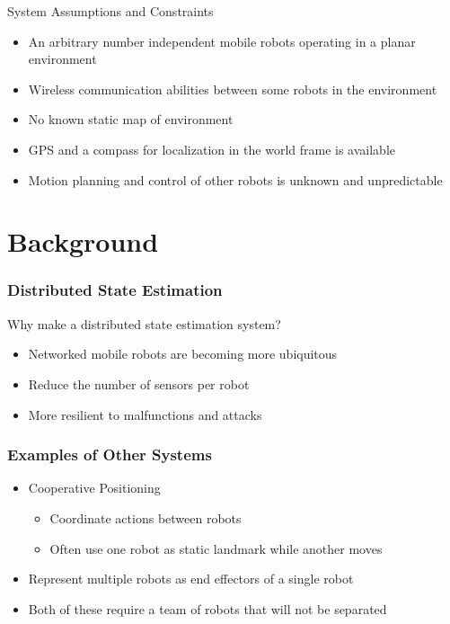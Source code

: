 \documentclass[14pt]{beamer}
\begin{document}
\begin{frame}{System Assumptions and Constraints}
\begin{itemize}
\item An arbitrary number independent mobile robots operating in a planar environment
\pause
\item Wireless communication abilities between some robots in the environment
\pause
\item No known static map of environment
\pause
\item GPS and a compass for localization in the world frame is available
\pause
\item Motion planning and control of other robots is unknown and unpredictable
\end{itemize}
\end{frame}

\section{Background}
\begin{frame}
\frametitle{Distributed State Estimation}
Why make a distributed state estimation system?
\pause
\begin{itemize}
\item Networked mobile robots are becoming more ubiquitous
\pause
\item Reduce the number of sensors per robot
\pause
\item More resilient to malfunctions and attacks
\end{itemize}
\end{frame}

\begin{frame}
\frametitle{Examples of Other Systems}
\begin{itemize}
\item Cooperative Positioning
    \begin{itemize}
    \pause
    \item Coordinate actions between robots
    \item Often use one robot as static landmark while another moves
    \end{itemize}
    \vspace{14pt}
    \pause
\item Represent multiple robots as end effectors of a single robot
\pause
\item Both of these require a team of robots that will not be separated
\end{itemize}
\end{frame}
\end{document}
